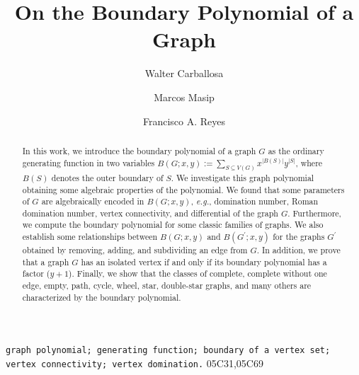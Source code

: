 \documentclass[review]{elsarticle}
\begin{document}
\begin{frontmatter}

\title{On the Boundary Polynomial of a Graph}


\author[FIU]{Walter Carballosa}

\author[FIU]{Marcos Masip}

\author[BC]{Francisco A. Reyes}

\address[FIU]{Department of Mathematics and Statistics, Florida International University,
Miami, Florida 33199, USA}

\address[BC]{Mathematics Department, Central Campus, Broward College, Davie, Florida 33314, USA}


\begin{abstract}
In this work, we introduce the boundary polynomial of a graph $G$ as the ordinary generating function in two variables $B(G;x,y):= \displaystyle\sum_{S\subseteq V(G)} x^{|B(S)|}y^{|S|}$, where $B(S)$ denotes the outer boundary of $S$.
We investigate this graph polynomial obtaining some algebraic properties of the polynomial. We found that some parameters of $G$ are algebraically encoded in $B(G;x,y)$, \emph{e.g.}, domination number, Roman domination number, vertex connectivity, and differential of the graph $G$. Furthermore, we compute the boundary polynomial for some classic families of graphs. We also establish some relationships between $B(G;x,y)$ and $B(G^\prime;x,y)$ for the graphs $G^\prime$ obtained by removing, adding, and subdividing an edge from $G$. In addition, we prove that a graph $G$ has an isolated vertex if and only if its boundary polynomial has a factor ($y+1$). Finally, we show that the classes of complete, complete without one edge, empty, path, cycle, wheel, star, double-star graphs, and many others are characterized by the boundary polynomial.
\end{abstract}

\begin{keyword}
\texttt{graph polynomial; generating function; boundary of a vertex set; vertex connectivity; vertex domination.}%
\MSC[2017] 05C31\sep 05C69
\end{keyword}

\end{frontmatter}
\end{document}
